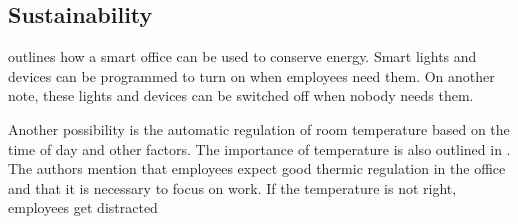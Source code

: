 \subsection{Sustainability}

\cite{hbcommunications} outlines how a smart office can be used to conserve energy. Smart lights and devices can be programmed to turn on when employees need them. On another note, these lights and devices can be switched off when nobody needs them.

Another possibility is the automatic regulation of room temperature based on the time of day and other factors. The importance of temperature is also outlined in \cite{living-lab}. The authors mention that employees expect good thermic regulation in the office and that it is necessary to focus on work. If the temperature is not right, employees get distracted 	 